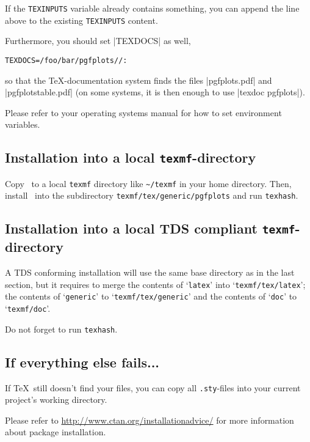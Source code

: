 If the \texttt{TEXINPUTS} variable already contains something, you can append the line above to the existing \texttt{TEXINPUTS} content.

Furthermore, you should set |TEXDOCS| as well,
\begin{lstlisting}
TEXDOCS=/foo/bar/pgfplots//:
\end{lstlisting}
so that the \TeX-documentation system finds the files |pgfplots.pdf| and |pgfplotstable.pdf| (on some systems, it is then enough to use |texdoc pgfplots|).

Please refer to your operating systems manual for how to set environment variables.

\subsection{Installation into a local \texttt{texmf}-directory}
Copy \PGFPlots\ to a local \texttt{texmf} directory like \lstinline!~/texmf! in your home directory. Then, install \PGFPlots\ into the subdirectory \lstinline!texmf/tex/generic/pgfplots! and run \lstinline!texhash!.

\subsection{Installation into a local TDS compliant \texttt{texmf}-directory}
A TDS conforming installation will use the same base directory as in the last section, but it requires to merge the contents of `\texttt{latex}' into `\texttt{texmf/tex/latex}'; the contents of `\texttt{generic}' to `\texttt{texmf/tex/generic}' and the contents of `\texttt{doc}' to `\texttt{texmf/doc}'.

Do not forget to run \lstinline!texhash!.

\subsection{If everything else fails...}
If \TeX\ still doesn't find your files, you can copy all \lstinline!.sty!-files into your current project's working directory.

Please refer to \url{http://www.ctan.org/installationadvice/} for more information about package installation.



